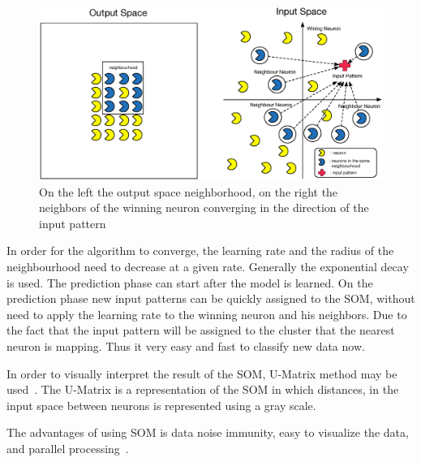 \begin{figure}
  \begin{center}
    \includegraphics[width=12cm]{images/5_neighbours_converge.eps}
  \end{center}
  \caption{ On the left the output space neighborhood, on the right the neighbors of the winning neuron converging in the direction of the input pattern }
  \label{fig:5_neighbours_converge}
\end{figure}

In order for the algorithm to converge, the learning rate and the radius of the neighbourhood need to decrease at a given rate. Generally the exponential decay is used.
The prediction phase can start after the model is learned. On the prediction phase new input patterns can be quickly assigned to the \ac{SOM}, without need to apply the learning rate to the winning neuron and his neighbors. Due to the fact that the input pattern will be assigned to the cluster that the nearest neuron is mapping. Thus it very easy and fast to classify new data now.

%

In order to visually interpret the result of the \ac{SOM}, \ac{U-Matrix} method may be used~\citep{Bacao2005}. The \ac{U-Matrix} is a representation of the \ac{SOM} in which distances, in the input space between neurons is represented using a gray scale.

The advantages of using \ac{SOM} is data noise immunity, easy to visualize the data, and parallel processing~\cite{Liu2012b}.
 
